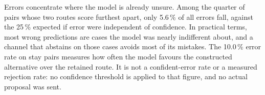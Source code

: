 \documentclass[conference,10pt,a4paper,IEEEoverridecommandlockouts]{IEEEtran}
\begin{document}
Errors concentrate where the model is already unsure. Among the quarter
of pairs whose two routes score furthest apart, only 5.6\,\% of all
errors fall, against the 25\,\% expected if error were independent of
confidence. In practical terms, most wrong predictions are cases the
model was nearly indifferent about, and a channel that abstains on those
cases avoids most of its mistakes.
The 10.0\,\% error rate on stay pairs measures how often the model
favours the constructed alternative over the retained route. It is not
a confident-error rate or a measured rejection rate: no confidence
threshold is applied to that figure, and no actual proposal was sent.
\end{document}
